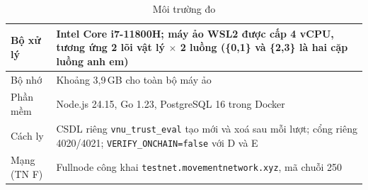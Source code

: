 \begin{table}[H]
\centering
\caption{Môi trường đo}
\label{tab:v2-eval-env}
\renewcommand{\arraystretch}{1.2}
\small
\begin{tabular}{|p{4.0cm}|p{9.4cm}|}
\hline
Bộ xử lý & Intel Core i7-11800H; máy ảo WSL2 được cấp 4 vCPU, tương ứng 2 lõi vật lý $\times$ 2 luồng (\{0,1\} và \{2,3\} là hai cặp luồng anh em) \\ \hline
Bộ nhớ & Khoảng 3,9\,GB cho toàn bộ máy ảo \\ \hline
Phần mềm & Node.js 24.15, Go 1.23, PostgreSQL 16 trong Docker \\ \hline
Cách ly & CSDL riêng \texttt{vnu\_trust\_eval} tạo mới và xoá sau mỗi lượt; cổng riêng 4020/4021; \texttt{VERIFY\_ONCHAIN=false} với D và E \\ \hline
Mạng (TN F) & Fullnode công khai \texttt{testnet.movementnetwork.xyz}, mã chuỗi 250 \\ \hline
\end{tabular}
\end{table}
